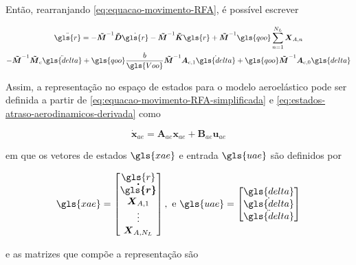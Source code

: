 Então, rearranjando \eqref{eq:equacao-movimento-RFA}, é possível escrever

\begin{multline}\label{eq:equacao-movimento-RFA-simplificada}
   \ddot{\gls{r}} =  -\boldsymbol{\Tilde{M}}^{-1}\boldsymbol{\Tilde{D}}\dot{\gls{r}} -\boldsymbol{\Tilde{M}}^{-1}\boldsymbol{\Tilde{K}}\gls{r} +\boldsymbol{\Tilde{M}}^{-1}\gls{qoo}\sum_{n=1}^{N_{L}}\boldsymbol{X}_{A,n} \\ -\boldsymbol{\Tilde{M}}^{-1}\boldsymbol{\Tilde{M}}_{c}\ddot{\gls{delta}} +\gls{qoo}\frac{b}{\gls{Voo}}\boldsymbol{\Tilde{M}}^{-1}\boldsymbol{A}_{c,1} \dot{\gls{delta}} + \gls{qoo}\boldsymbol{\Tilde{M}}^{-1}\boldsymbol{A}_{c,0}\gls{delta}
\end{multline}

Assim, a representação no espaço de estados para o modelo aeroelástico pode ser definida a partir de \eqref{eq:equacao-movimento-RFA-simplificada} e \eqref{eq:estados-atraso-aerodinamicos-derivada} como

\begin{equation}\label{eq:espaço-estados-aeroelastico}
    \dot{\boldsymbol{x}}_{ae} = \boldsymbol{A}_{ae}\boldsymbol{x}_{ae} + \boldsymbol{B}_{ae}\boldsymbol{u}_{ae}
\end{equation}

\noindent em que os vetores de estados $\gls{xae}$ e entrada $\gls{uae}$ são definidos por

\begin{equation}\label{eq:ss-aeroelastico-definicao}
\begin{gathered}
    \gls{xae} = \begin{bmatrix}
        \gls{r} \\ \boldsymbol{\dot{\gls{r}}} \\ \boldsymbol{X}_{A,1} \\ \vdots \\ \boldsymbol{X}_{A,N_{L}}
    \end{bmatrix}, 
    \ \text{e} \ 
    \gls{uae} = \begin{bmatrix}
        \gls{delta} \\ \dot{\gls{delta}} \\ \ddot{\gls{delta}}
    \end{bmatrix}
\end{gathered}
\end{equation}

\noindent e as matrizes que compõe a representação são

